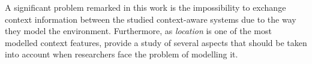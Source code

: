 A significant problem remarked in this work is the impossibility to exchange
context information between the studied context-aware systems due to the way
they model the environment. Furthermore, as \textit{location} is one of the most 
modelled context features, \citeauthor{chen_survey_2000} provide a study of 
several aspects that should be taken into account when researchers face the 
problem of modelling it. 




